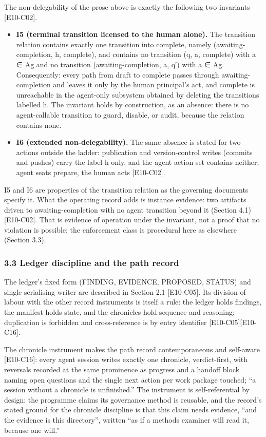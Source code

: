 \documentclass[
  11pt,
]{article}
\begin{document}
The non-delegability of the prose above is exactly the following two
invariants {[}E10-C02{]}.

\begin{itemize}
\item
  \textbf{I5 (terminal transition licensed to the human alone).} The
  transition relation contains exactly one transition into complete,
  namely (awaiting-completion, h, complete), and contains no transition
  (q, a, complete) with a ∈ Ag and no transition (awaiting-completion,
  a, q′) with a ∈ Ag. Consequently: every path from draft to complete
  passes through awaiting-completion and leaves it only by the human
  principal's act, and complete is unreachable in the agent-only
  subsystem obtained by deleting the transitions labelled h. The
  invariant holds by construction, as an absence: there is no
  agent-callable transition to guard, disable, or audit, because the
  relation contains none.
\item
  \textbf{I6 (extended non-delegability).} The same absence is stated
  for two actions outside the ladder: publication and version-control
  writes (commits and pushes) carry the label h only, and the agent
  action set contains neither; agent seats prepare, the human acts
  {[}E10-C02{]}.
\end{itemize}

I5 and I6 are properties of the transition relation as the governing
documents specify it. What the operating record adds is instance
evidence: two artifacts driven to awaiting-completion with no agent
transition beyond it (Section 4.1) {[}E10-C02{]}. That is evidence of
operation under the invariant, not a proof that no violation is
possible; the enforcement class is procedural here as elsewhere (Section
3.3).

\subsubsection{3.3 Ledger discipline and the path
record}\label{ledger-discipline-and-the-path-record}

The ledger's fixed form (FINDING, EVIDENCE, PROPOSED, STATUS) and single
serialising writer are described in Section 2.1 {[}E10-C05{]}. Its
division of labour with the other record instruments is itself a rule:
the ledger holds findings, the manifest holds state, and the chronicles
hold sequence and reasoning; duplication is forbidden and
cross-reference is by entry identifier {[}E10-C05{]}{[}E10-C16{]}.

The chronicle instrument makes the path record contemporaneous and
self-aware {[}E10-C16{]}: every agent session writes exactly one
chronicle, verdict-first, with reversals recorded at the same prominence
as progress and a handoff block naming open questions and the single
next action per work package touched; ``a session without a chronicle is
unfinished.'' The instrument is self-referential by design: the
programme claims its governance method is reusable, and the record's
stated ground for the chronicle discipline is that this claim needs
evidence, ``and the evidence is this directory'', written ``as if a
methods examiner will read it, because one will.''
\end{document}
